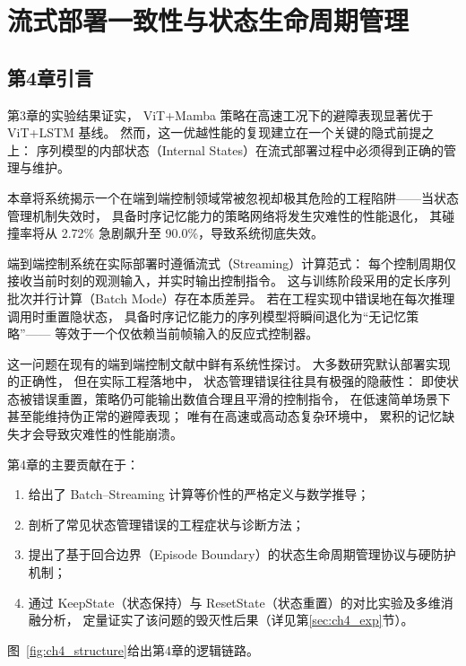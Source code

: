 \chapter{流式部署一致性与状态生命周期管理}

\section{第4章引言}

第3章的实验结果证实，
ViT+Mamba 策略在高速工况下的避障表现显著优于 ViT+LSTM 基线。
然而，这一优越性能的复现建立在一个关键的隐式前提之上：
序列模型的内部状态（Internal States）在流式部署过程中必须得到正确的管理与维护。

本章将系统揭示一个在端到端控制领域常被忽视却极其危险的工程陷阱——当状态管理机制失效时，
具备时序记忆能力的策略网络将发生灾难性的性能退化，
其碰撞率将从 2.72\% 急剧飙升至 90.0\%，导致系统彻底失效。

端到端控制系统在实际部署时遵循流式（Streaming）计算范式：
每个控制周期仅接收当前时刻的观测输入，并实时输出控制指令。
这与训练阶段采用的定长序列批次并行计算（Batch Mode）存在本质差异。
若在工程实现中错误地在每次推理调用时重置隐状态，
具备时序记忆能力的序列模型将瞬间退化为``无记忆策略''——
等效于一个仅依赖当前帧输入的反应式控制器。

这一问题在现有的端到端控制文献中鲜有系统性探讨。
大多数研究默认部署实现的正确性，
但在实际工程落地中，
状态管理错误往往具有极强的隐蔽性：
即使状态被错误重置，策略仍可能输出数值合理且平滑的控制指令，
在低速简单场景下甚至能维持伪正常的避障表现；
唯有在高速或高动态复杂环境中，
累积的记忆缺失才会导致灾难性的性能崩溃。

第4章的主要贡献在于：
\begin{enumerate}
    \item 给出了 Batch--Streaming 计算等价性的严格定义与数学推导；
    \item 剖析了常见状态管理错误的工程症状与诊断方法；
    \item 提出了基于回合边界（Episode Boundary）的状态生命周期管理协议与硬防护机制；
    \item 通过 KeepState（状态保持）与 ResetState（状态重置）的对比实验及多维消融分析，
    定量证实了该问题的毁灭性后果（详见第\ref{sec:ch4_exp}节）。
\end{enumerate}

图~\ref{fig:ch4_structure}给出第4章的逻辑链路。

